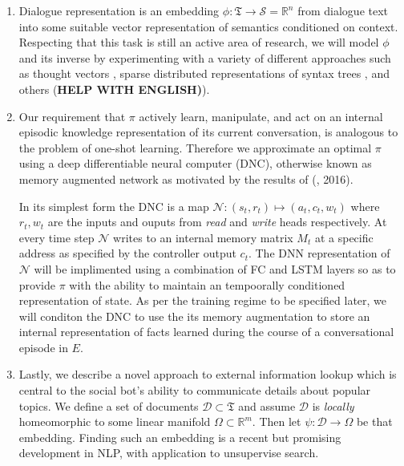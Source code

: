 \documentclass{article} %
\theoremstyle{named}
\def\scriptd{{\mathcal D}}
\def\scriptn{{\mathcal N}}
\def\scripts{{\mathcal S}}
\begin{document}
\begin{enumerate}
\item Dialogue representation is an embedding $ \phi: \mathfrak{T} \to \scripts = \mathbb{R}^n $ from dialogue text into some suitable vector representation of semantics conditioned on context. Respecting that this task is still an active area of research, we will model $ \phi $ and its inverse by experimenting with a variety of different approaches such as thought vectors \cite{NIPS2015_5950}, sparse distributed representations of syntax trees \cite{DBLP:journals/corr/YogatamaFDS14}, and others (\textbf{HELP WITH ENGLISH)}).

\item Our requirement that $ \pi $ actively learn, manipulate, and act on an internal episodic knowledge representation of its current conversation, is analogous to the problem of one-shot learning. Therefore we approximate an optimal $ \pi $ using a deep differentiable neural computer (DNC)\cite{graves2016hybrid}\cite{DBLP:journals/corr/GravesWD14}, otherwise known as memory augmented network as motivated by the results of (\citeauthor{DBLP:journals/corr/SantoroBBWL16}, 2016).

In its simplest form the DNC is a map $\scriptn: (s_t, r_t) \mapsto (a_t, c_t, w_t)$ where  $r_t, w_t$ are the inputs and ouputs from \emph{read} and \emph{write} heads respectively. At every time step $\scriptn$ writes to an internal memory matrix $M_t$ at a specific address as specified by the controller output $c_t$. The DNN representation of $\scriptn$ will be implimented using a combination of FC and LSTM layers so as to provide $\pi$ with the ability to maintain an tempoorally conditioned representation of state. As per the training regime to be specified later, we will conditon the DNC to use the its memory augmentation to store an internal representation of facts learned during the course of a conversational episode in $E$.


\item Lastly, we describe a novel approach to external information lookup which is central to the social bot's ability to communicate details about popular topics. We define a set of documents $\scriptd \subset \mathfrak{T}$ and assume $\scriptd$ is \emph{locally} homeomorphic to some linear manifold $\Omega \subset \mathbb{R}^m$. Then let $\psi: \scriptd \to \Omega$ be that embedding. Finding such an embedding is a recent but promising development in NLP, with application to unsupervise search\cite{DBLP:journals/corr/DaiOL15}.


\end{enumerate}
\end{document}
